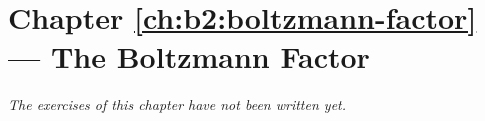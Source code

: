 \section*{Chapter \ref{ch:b2:boltzmann-factor} --- The Boltzmann Factor}


\emph{The exercises of this chapter have not been written yet.}
